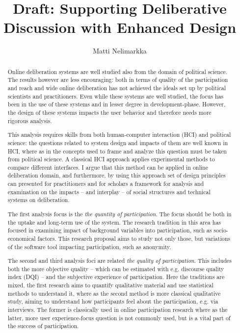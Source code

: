 \documentclass{article}
\author{Matti Nelimarkka}
\title{Draft: Supporting Deliberative Discussion with Enhanced Design}
\begin{document}
\maketitle

\setlength{\parindent}{0pt}
\setlength{\parskip}{1ex}

\begin{abstract}
Online deliberation systems are well studied also from the domain of political science. The results however are less encouraging: both in terms of quality of the participation and reach and wide online deliberation has not achieved the ideals set up by political scientists and practitioners. Even while these systems are well studied, the focus has been in the use of these systems and in lesser degree in development-phase. However, the design of these systems impacts the user behavior and therefore needs more rigorous analysis.

This analysis requires skills from both human-computer interaction (HCI) and political science: the questions related to system design and impacts of them are well known in HCI, where as in the concepts used to frame and analyze this question must be taken from political science. A classical HCI approach applies experimental methods to compare different interfaces. I argue that this method can be applied in online deliberation domain, and furthermore, by using this approach set of design principles can presented for practitioners and for scholars a framework for analysis and examination on the impacts -- and interplay -- of social structures and technical systems on deliberation.

The first analysis focus is the \textit{the quantity of participation}. The focus should be both in the uptake and long-term use of the system. The research tradition in this area has focused in examining impact of background variables into participation, such as socio-economical factors. This research proposal aims to study not only those, but variations of the software tool impacting participation, such as anonymity.

The second and third analysis foci are related \textit{the quality of participation}. This includes both the more objective quality -- which can be estimated with e.g.  discourse quality index (DQI) -- and the subjective experience of participation. Here the traditions are mixed, the first research aims to quantify qualitative material and use statistical methods to understand it, where as the second method is more classical qualitative study, aiming to understand how participants feel about the participation, e.g. via interviews. The former is classically used in online participation research where as the latter, more user experience-focus question is not commonly used, but is a vital part of the success of participation.
\end{abstract}
\end{document}
